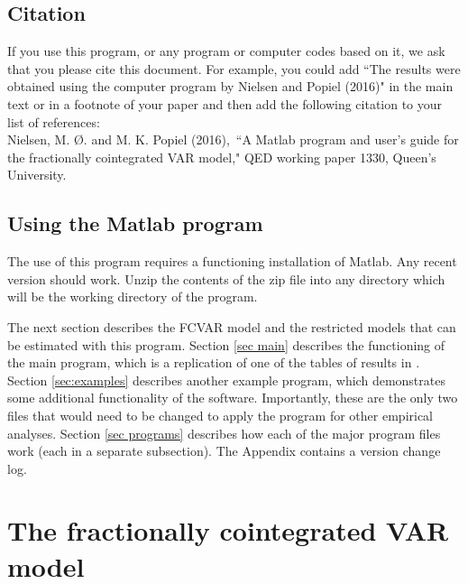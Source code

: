 \documentclass[10pt]{article}
\begin{document}
\subsection{Citation}

If you use this program, or any program or computer codes based on it, we ask that you please cite this document. For example, you could add ``The results were obtained using the computer program by Nielsen and Popiel (2016)" in the main text or in a footnote of your paper and then add the following citation to your list of references:\\

\noindent Nielsen, M. \O. and M. K. Popiel (2016),\ ``A Matlab program and user's guide for the fractionally cointegrated VAR model," QED working paper 1330, Queen's University.
\\

\subsection{Using the Matlab program}

The use of this program requires a functioning installation of Matlab. Any recent version should work. Unzip the contents of the zip file into any directory which will be the working directory of the program.

The next section describes the FCVAR model and the restricted models that can be estimated with this program. Section \ref{sec main} describes the functioning of the main program, which is a replication of one of the tables of results in \cite{JNP2014}. Section \ref{sec:examples} describes another example program, which demonstrates some additional functionality of the software. Importantly, these are the only two files that would need to be changed to apply the program for other empirical analyses. Section \ref{sec programs} describes how each of the major program files work (each in a separate subsection). The Appendix contains a version change log.


\newpage

\section{The fractionally cointegrated VAR model}
\label{sec fcvar}
\end{document}
